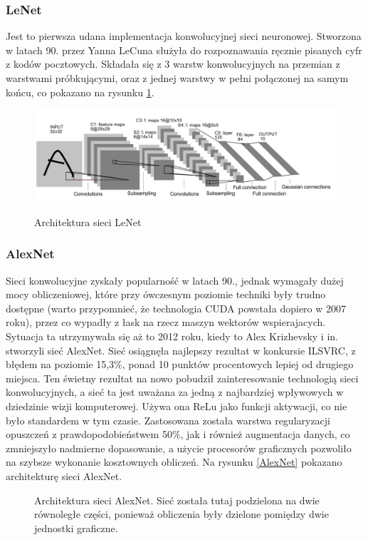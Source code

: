 \documentclass[a4paper,twoside,12pt]{book}
\begin{document}
{\subsubsection{LeNet\cite{lecun1998gradient}}
{Jest to pierwsza udana implementacja konwolucyjnej sieci neuronowej. Stworzona w latach 90. przez Yanna LeCuna służyła do rozpoznawania ręcznie pisanych cyfr z kodów pocztowych. Składała się z 3 warstw konwolucyjnych na przemian z warstwami próbkującymi, oraz z jednej warstwy w pełni połączonej na samym końcu, co pokazano na rysunku \ref{LeNet}. }

\begin{figure}[h]
\caption{Architektura sieci LeNet}

\centering
\includegraphics[scale=0.6]{le-net-5.png}
\label{LeNet}
\end{figure}

\subsubsection{AlexNet\cite{krizhevsky2012imagenet}}
{Sieci konwolucyjne zyskały popularność w latach 90., jednak wymagały dużej mocy obliczeniowej, które przy ówczesnym poziomie techniki były trudno dostępne (warto przypomnieć, że technologia CUDA powstała dopiero w 2007 roku), przez co wypadły z łask na rzecz maszyn wektorów wspierajacych\cite{girshick2014rich}. Sytuacja ta utrzymywała się aż to 2012 roku, kiedy to Alex Krizhevsky i in. stworzyli sieć AlexNet. Sieć osiągnęła najlepszy rezultat w konkursie ILSVRC, z błędem na poziomie 15,3\%, ponad 10 punktów procentowych lepiej od drugiego miejsca. Ten świetny rezultat na nowo pobudził zainteresowanie technologią sieci konwolucyjnych, a sieć ta jest uważana za jedną z najbardziej wpływowych w dziedzinie wizji komputerowej. Używa ona ReLu jako funkcji aktywacji, co nie było standardem w tym czasie. Zastosowana została warstwa regularyzacji opuszczeń z prawdopodobieństwem 50\%, jak i również augmentacja danych, co zmniejszyło nadmierne dopasowanie, a użycie procesorów graficznych pozwoliło na szybsze wykonanie kosztownych obliczeń. Na rysunku \ref{AlexNet} pokazano architekturę sieci AlexNet.}
\begin{figure}[h]
\caption{Architektura sieci AlexNet. Sieć została tutaj podzielona na dwie równoległe części, ponieważ obliczenia były dzielone pomiędzy dwie jednostki graficzne.}


\end{figure}}
\end{document}

